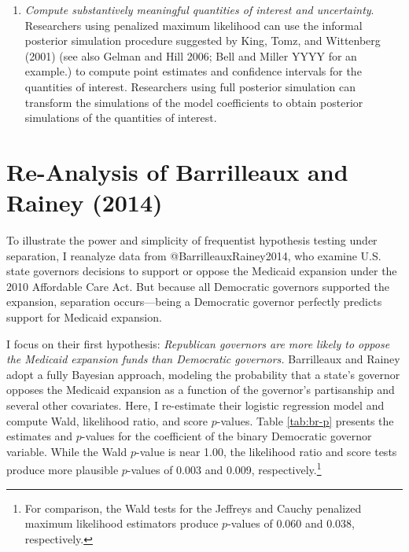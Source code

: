 \documentclass[
]{article}
\begin{document}
\begin{enumerate}
{    the Firth penalty. The simulations show that the Firth \(p\)-values
    can reject the null hypothesis incorrectly at well above the nominal
    rate for a variable that often creates separation.}
\item
  \emph{Compute substantively meaningful quantities of interest and
  uncertainty}. Researchers using penalized maximum likelihood can use
  the informal posterior simulation procedure suggested by King, Tomz,
  and Wittenberg (2001) (see also Gelman and Hill 2006; Bell and Miller
  YYYY for an example.) to compute point estimates and confidence
  intervals for the quantities of interest. Researchers using full
  posterior simulation can transform the simulations of the model
  coefficients to obtain posterior simulations of the quantities of
  interest.
\end{enumerate}

\hypertarget{re-analysis-of-barrilleaux-and-rainey-2014}{%
\section{Re-Analysis of Barrilleaux and Rainey
(2014)}\label{re-analysis-of-barrilleaux-and-rainey-2014}}

To illustrate the power and simplicity of frequentist hypothesis testing
under separation, I reanalyze data from @BarrilleauxRainey2014, who
examine U.S. state governors decisions to support or oppose the Medicaid
expansion under the 2010 Affordable Care Act. But because all Democratic
governors supported the expansion, separation occurs---being a
Democratic governor perfectly predicts support for Medicaid expansion.

I focus on their first hypothesis: \emph{Republican governors are more
likely to oppose the Medicaid expansion funds than Democratic
governors.} Barrilleaux and Rainey adopt a fully Bayesian approach,
modeling the probability that a state's governor opposes the Medicaid
expansion as a function of the governor's partisanship and several other
covariates. Here, I re-estimate their logistic regression model and
compute Wald, likelihood ratio, and score \(p\)-values. Table
\ref{tab:br-p} presents the estimates and \(p\)-values for the
coefficient of the binary Democratic governor variable. While the Wald
\(p\)-value is near 1.00, the likelihood ratio and score tests produce
more plausible \(p\)-values of 0.003 and 0.009, respectively.\footnote{For
  comparison, the Wald tests for the Jeffreys and Cauchy penalized
  maximum likelihood estimators produce \(p\)-values of 0.060 and 0.038,
  respectively.}
\end{document}

